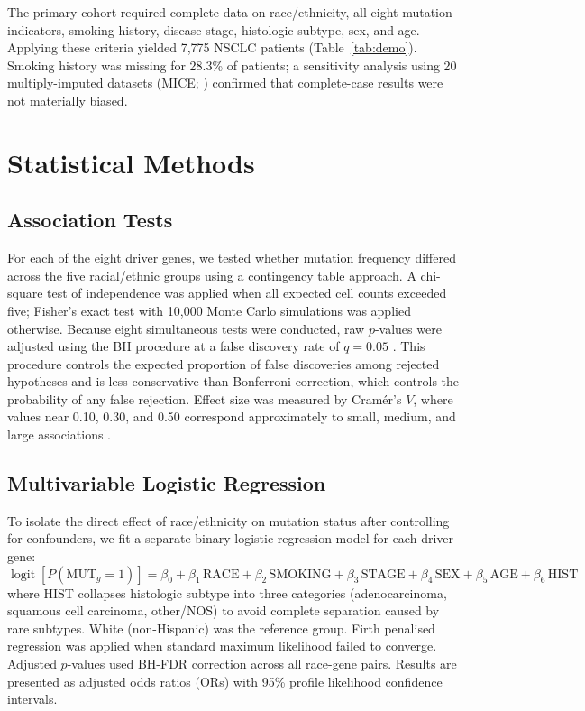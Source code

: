 \documentclass[12pt]{article}
\begin{document}
The primary cohort required complete data on race/ethnicity, all eight
mutation indicators, smoking history, disease stage, histologic subtype, sex,
and age.
Applying these criteria yielded 7,775 NSCLC patients (Table~\ref{tab:demo}).
Smoking history was missing for 28.3\% of patients; a sensitivity analysis
using 20 multiply-imputed datasets (MICE; \cite{vanBuuren2018}) confirmed that
complete-case results were not materially biased.

\section{Statistical Methods}

\subsection{Association Tests}

For each of the eight driver genes, we tested whether mutation frequency
differed across the five racial/ethnic groups using a contingency table
approach.
A chi-square test of independence was applied when all expected cell counts
exceeded five; Fisher's exact test with 10,000 Monte Carlo simulations was
applied otherwise.
Because eight simultaneous tests were conducted, raw $p$-values were adjusted
using the BH procedure at a false discovery rate of $q = 0.05$
\cite{BH1995}.
This procedure controls the expected proportion of false discoveries among
rejected hypotheses and is less conservative than Bonferroni correction, which
controls the probability of any false rejection.
Effect size was measured by Cram\'{e}r's $V$, where values near 0.10, 0.30,
and 0.50 correspond approximately to small, medium, and large associations
\cite{Cohen1988}.

\subsection{Multivariable Logistic Regression}

To isolate the direct effect of race/ethnicity on mutation status after
controlling for confounders, we fit a separate binary logistic regression model
for each driver gene:
\begin{equation}
  \operatorname{logit}\!\left[P(\mathrm{MUT}_{g}=1)\right]
  = \beta_0
  + \beta_1\,\mathrm{RACE}
  + \beta_2\,\mathrm{SMOKING}
  + \beta_3\,\mathrm{STAGE}
  + \beta_4\,\mathrm{SEX}
  + \beta_5\,\mathrm{AGE}
  + \beta_6\,\mathrm{HIST}
\end{equation}
where HIST collapses histologic subtype into three categories
(adenocarcinoma, squamous cell carcinoma, other/NOS) to avoid complete
separation caused by rare subtypes.
White (non-Hispanic) was the reference group.
Firth penalised regression was applied when standard maximum likelihood failed
to converge.
Adjusted $p$-values used BH-FDR correction across all race-gene pairs.
Results are presented as adjusted odds ratios (ORs) with 95\% profile
likelihood confidence intervals.
\end{document}

